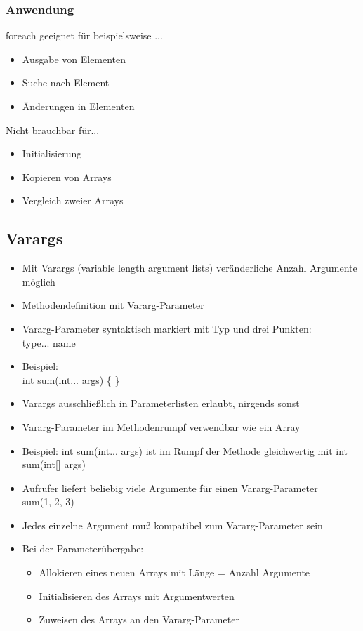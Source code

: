 \subsubsection{Anwendung}
foreach geeignet für beispielsweise ...
\begin{itemize}
\item Ausgabe von Elementen
\item Suche nach Element
\item Änderungen in Elementen
\end{itemize}
 Nicht brauchbar für...
 \begin{itemize}
\item Initialisierung
\item Kopieren von Arrays
\item Vergleich zweier Arrays
\end{itemize}

\subsection{Varargs}
\begin{itemize}
\item Mit Varargs (variable length argument lists) veränderliche Anzahl Argumente möglich
\item Methodendefinition mit Vararg-Parameter
\item Vararg-Parameter syntaktisch markiert mit Typ und drei Punkten:\\
type... name
\item Beispiel:\\
int sum(int... args) \{ \}
\item Varargs ausschließlich in Parameterlisten erlaubt, nirgends sonst
\item Vararg-Parameter im Methodenrumpf verwendbar wie ein Array
\item Beispiel: int sum(int... args) ist im Rumpf der Methode gleichwertig mit int sum(int[] args)
\item Aufrufer liefert beliebig viele Argumente für einen Vararg-Parameter \\
sum(1, 2, 3)
\item Jedes einzelne Argument muß kompatibel zum Vararg-Parameter sein
\item Bei der Parameterübergabe:
\begin{itemize}
\item Allokieren eines neuen Arrays mit Länge = Anzahl Argumente
\item Initialisieren des Arrays mit Argumentwerten
\item Zuweisen des Arrays an den Vararg-Parameter
\end{itemize}
\end{itemize}
%
%
%
